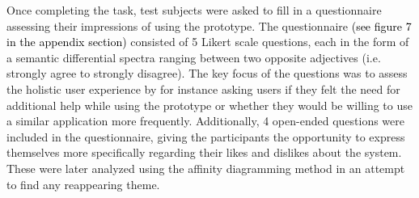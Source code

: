 \documentclass[prodmode,acmtomm]{acmsmall}
\begin{document}
Once completing the task, test subjects were asked to fill in a questionnaire assessing their impressions of using the prototype. The questionnaire \textcolor{black}{(see figure 7 in the appendix section)} consisted of 5 Likert scale questions, each in the form of a semantic differential spectra ranging between two opposite adjectives (i.e. strongly agree to strongly disagree). The key focus of the questions was to assess the holistic user experience by for instance asking users if they felt the need for additional help while using the prototype or whether they would be willing to use a similar application more frequently. Additionally, 4 open-ended questions were included in the questionnaire, giving the participants the opportunity to express themselves more specifically regarding their likes and dislikes about the system. These were later analyzed using the affinity diagramming method \cite{tullis2008} in an attempt to find any reappearing theme. 
\end{document}
